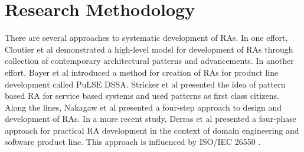 \documentclass[runningheads]{llncs}
\begin{document}

\section{Research Methodology}
There are several approaches to systematic development of RAs. In one effort, Cloutier et al \cite{Cloutier} demonstrated a high-level model for development of RAs through collection of contemporary architectural patterns and advancements. In another effort, Bayer et al \cite{bayer1999pulse} introduced a method for creation of RAs for product line development called PuLSE DSSA. Stricker et al \cite{stricker2010creating} presented the idea of pattern based RA for service based systems and used patterns as first class citizens. Along the lines, Nakagaw et al \cite{nakagawa2014consolidating} presented a four-step approach to design and development of RAs. In a more recent study, Derras et al \cite{Derras} presented a four-phase approach for practical RA development in the context of domain engineering and software product line. This approach is influenced by ISO/IEC 26550 \cite{wg2015iso}.








\end{document}
